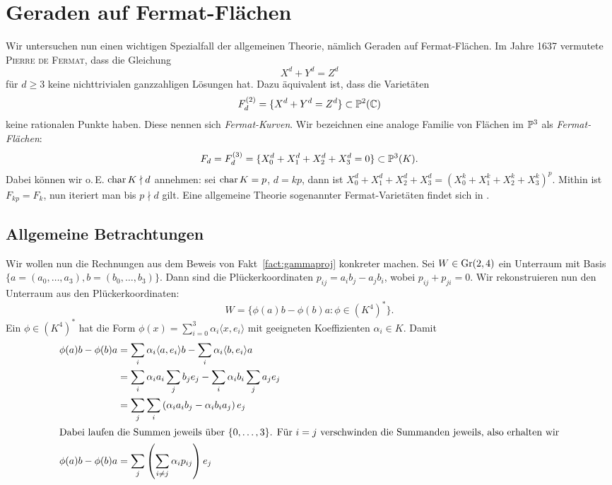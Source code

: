 \chapter{Geraden auf Fermat-Flächen} \label{chap:fermat}
Wir untersuchen nun einen wichtigen Spezialfall der allgemeinen Theorie, nämlich Geraden auf Fermat-Flächen. Im Jahre 1637 vermutete \textsc{Pierre de Fermat}, dass die Gleichung
\begin{equation*}
X^d + Y^d = Z^d
\end{equation*}
für $d \geq 3$ keine nichttrivialen ganzzahligen Lösungen hat. Dazu äquivalent ist, dass die Varietäten
\begin{equation*}
F_d^{(2)} = \{ X^d + Y^d = Z^d \} \subset \mathbb P^{2}(\mathbb C)
\end{equation*}
keine rationalen Punkte haben. Diese nennen sich \emph{Fermat-Kurven}. Wir bezeichnen eine analoge Familie von Flächen im $\mathbb P^{3}$ als \emph{Fermat-Flächen}:
\begin{equation}
F_d = F_d^{(3)} = \{ X_0^d + X_1^d + X_2^d + X_3^d = 0 \} \subset \mathbb P^{3}(K).
\end{equation}
Dabei können wir o.\,E. $\operatorname{char} K \nmid d$ annehmen: sei $\operatorname{char} K = p$, $d = kp$, dann ist $X_0^d + X_1^d + X_2^d + X_3^d = (X_0^k + X_1^k + X_2^k + X_3^k)^p$. Mithin ist $F_{kp} = F_k$, nun iteriert man bis $p \nmid d$ gilt. Eine allgemeine Theorie sogenannter Fermat-Varietäten findet sich in \cite{Fermat}.

\section{Allgemeine Betrachtungen}
Wir wollen nun die Rechnungen aus dem Beweis von Fakt~\ref{fact:gammaproj} konkreter machen. Sei $W \in \grass 2/4$ ein Unterraum mit Basis $\{a = (a_0, \dots, a_3), b = (b_0, \dots, b_3)\}$. Dann sind die Plückerkoordinaten $p_{ij} = a_i b_j - a_j b_i$, wobei $p_{ij} + p_{ji} = 0$. Wir rekonstruieren nun den Unterraum aus den Plückerkoordinaten:
\begin{equation}
W = \{ \phi(a)b - \phi(b)a \colon \phi \in (K^4)^* \}.
\end{equation}
Ein $\phi \in (K^4)^*$ hat die Form $\phi(x) = \sum_{i=0}^3 \alpha_i \langle x, e_i \rangle$ mit geeigneten Koeffizienten $\alpha_i \in K$. Damit
\begin{align*}
\phi(a)b - \phi(b)a &= \sum_i \alpha_i \langle a, e_i \rangle b - \sum_i \alpha_i \langle b, e_i \rangle a \\
	&= \sum_i \alpha_i a_i \sum_j b_j e_j - \sum_i \alpha_i b_i \sum_j a_j e_j \\
	&= \sum_j \sum_i \left(\alpha_i a_i b_j - \alpha_i b_i a_j \right) e_j \\
\intertext{Dabei laufen die Summen jeweils über $\{0,\dots,3\}$. Für $i=j$ verschwinden die Summanden jeweils, also erhalten wir}
\phi(a)b - \phi(b)a &= \sum_j \left(\sum_{i \neq j} \alpha_i p_{ij} \right) e_j
\end{align*}

